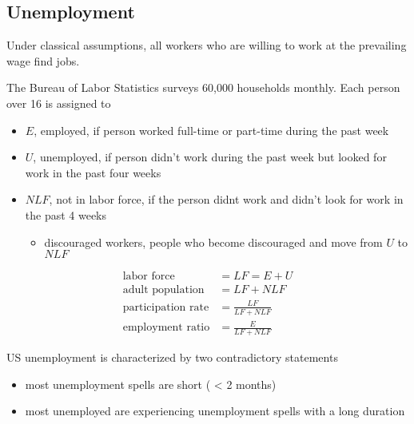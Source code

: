 \subsection{Unemployment}

Under classical assumptions, all workers who are willing to work at the prevailing wage find jobs. 

\begin{remark}
    The Bureau of Labor Statistics surveys 60,000 households monthly. Each person over 16 is assigned to 
    \begin{itemize}
        \item $E$, employed, if person worked full-time or part-time during the past week
        \item $U$, unemployed, if person didn't work during the past week but looked for work in the past four weeks
        \item $NLF$, not in labor force, if the person didnt work and didn't look for work in the past 4 weeks
        \begin{itemize}
            \item discouraged workers, people who become discouraged and move from $U$ to $NLF$
        \end{itemize} 
    \end{itemize} 
    \begin{align*}
        \text{labor force} &= LF =  E + U \\
        \text{adult population} &= LF + NLF \\
        \text{participation rate} &= \frac{LF}{LF + NLF} \\
        \text{employment ratio} &= \frac{E}{LF + NLF}
    \end{align*}
\end{remark}

\begin{remark}
    US unemployment is characterized by two contradictory statements
    \begin{itemize}
        \item most unemployment spells are short ( < 2 months)
        \item most unemployed are experiencing unemployment spells with a long duration
    \end{itemize} 
\end{remark}

